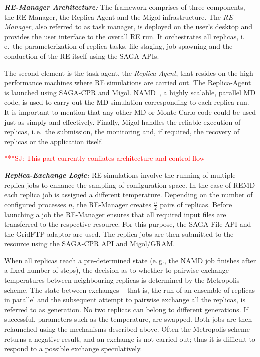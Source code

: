 \documentclass{rspublic}
\newcommand{\jhanote}[1]{ {\textcolor{red} { ***SJ: #1 }}}
\newcommand{\jhanote}[1]{}
\newcommand{\replicaagent}[1]{Replica-Agent }
\newcommand{\remanager}[1]{RE-Manager }
\begin{document}
{\it \bf RE-Manager Architecture:} The
framework comprises of three components, the RE-Man\-ag\-er,
the Replica-Agent and the Migol infrastructure. 
The  \emph{RE-Manager}, also referred to as task manager,
is deployed on the user's desktop and provides the user interface 
to the overall RE run. It orchestrates all replicas, i.\,e.\ the 
parameterization of replica  tasks, file staging, job spawning 
and the conduction of the RE itself using the SAGA APIs.                                                                

The second element is the task agent, the \textit{Replica-Agent},
that resides on the high performance machines where RE simulations
are carried out. The \replicaagent\ is launched using SAGA-CPR and Migol.
NAMD~\citep{Phillips:2005gd}, a highly scalable, parallel MD code, is
used to carry out the MD simulation corresponding to each replica
run. It is important to mention that any other MD or
Monte Carlo code could be used just as simply and effectively.
Finally, Migol handles the reliable execution of replicas, i.\,e.\ the
submission, the monitoring and, if required, the recovery of replicas
or the application itself.




\jhanote{This part currently conflates architecture and control-flow}
                       
\noindent                                            
{\it \bf Replica-Exchange Logic:} RE simulations involve the running of multiple replica jobs to enhance
the sampling of configuration space. In the case of REMD each replica
job is assigned a different temperature.  Depending on the number of
configured processes $n$, the \remanager\ creates $\frac{n}{2}$ pairs
of replicas.  Before launching a job the \remanager\ ensures that all
required input files are transferred to the respective resource. For
this purpose, the SAGA File API and the GridFTP adaptor are used.  
The replica jobs are then submitted to the resource using the SAGA-CPR API and
Migol/GRAM. 

When all replicas reach a pre-determined state (e.\,g., the NAMD job
finishes after a fixed number of steps), the decision as to whether to
pairwise exchange temperatures between neighbouring replicas is
determined by the Metropolis scheme. %
The state between exchanges -- that is, the run of an ensemble of replicas
in parallel and the subsequent attempt to pairwise exchange all the
replicas, is referred to as generation. No two replicas can belong to
different generations.  If successful, parameters such as the
temperature, are swapped. Both jobs are then relaunched using the
mechanisms described above. Often the Metropolis scheme returns a
negative result, and an exchange is not carried out; thus it is
difficult to respond to a possible exchange speculatively.
\end{document}
